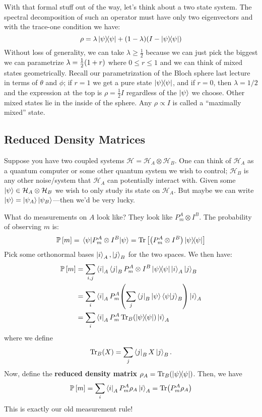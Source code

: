 With that formal stuff out of the way, let's think about a two state system. The spectral decomposition
of such an operator must have only two eigenvectors and with the trace-one condition we have:
\[ \rho = \lambda \ketbra{\psi}{\psi} + (1 - \lambda)(I - \ketbra{\psi}{\psi}) \]
Without loss of generality, we can take $\lambda \geq \frac{1}{2}$ because we can just pick the biggest
we can parametrize $\lambda = \frac{1}{2} \qty(1 + r)$ where $0 \leq r \leq 1$ and we can think of
mixed states geometrically. Recall our parametrization of the Bloch sphere last lecture in terms of $\theta$ and $\phi$;
if $r = 1$ we get a pure state $\ketbra{\psi}{\psi}$, and if $r = 0$, then $\lambda = 1/2$ and the expression at the top is $\rho = \frac{1}{2} I$
regardless of the $\ket{\psi}$ we choose. Other mixed states lie in the inside of the sphere. Any $\rho \propto I$ is called a
``maximally mixed'' state.

\subsection{Reduced Density Matrices}
Suppose you have two coupled systems $\mathcal{H} = \mathcal{H}_A \otimes \mathcal{H}_B$. One can think
of $\mathcal{H}_A$ as a quantum computer or some other quantum system we wish to control; $\mathcal{H}_B$ is any other
noise/system that $\mathcal{H}_A$ can potentially interact with. Given some $\ket{\psi} \in \mathcal{H}_A \otimes \mathcal{H}_B$
we wish to only study its state on $\mathcal{H}_A$. But maybe we can write $\ket{\psi} = \ket{\psi_A} \ket{\psi_B}$—then we'd be very lucky.

What do measurements on $A$ look like? They look like $P_m^{A} \otimes I^B$. The probability of observing $m$ is:
\[ \mathbb{P}\left[ m \right] = \mel{\psi}{P_m^A \otimes I^B}{\psi} = \Tr\qty[\qty(P_m^A \otimes I^B) \ketbra{\psi}{\psi}] \]
Pick some orthonormal bases $\ket{i}_A, \ket{j}_B$ for the two spaces. We then have:
\begin{align*}
    \mathbb{P}\left[ m \right] &= \sum_{i, j} \bra{i}_A \bra{j}_B P_m^A \otimes I^B \ketbra{\psi}{\psi} \ket{i}_A \ket{j}_B \\
    &= \sum_{i} \bra{i}_A P_m^A \qty(\sum_j \bra{j}_B\ket{\psi} \bra{\psi} \ket{j}_B) \ket{i}_A \\
    &= \sum_{i} \bra{i}_A P_m^A \Tr_B(\ketbra{\psi}{\psi}) \ket{i}_A
\end{align*}
where we define
\[ \Tr_B(X) = \sum_j \bra{j}_B X \ket{j}_B. \]
Now, define the \textbf{reduced density matrix} $\rho_A = \Tr_B(\ketbra{\psi}{\psi})$. Then, we have
\[ \mathbb{P}\left[ m \right] = \sum_i \bra{i}_A P_m^A \rho_A \ket{i}_A = \Tr(P_m^A \rho_A) \]
This is exactly our old measurement rule!

